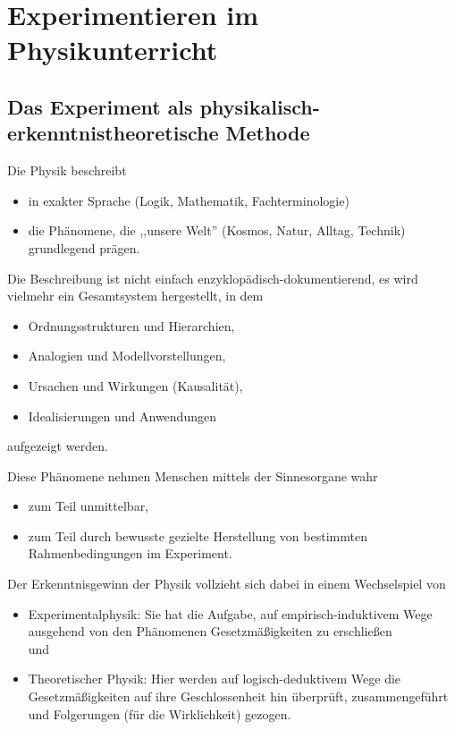 \chapter{Experimentieren im Physikunterricht}\label{Experiment}

\section{Das Experiment als physikalisch-
                         erkenntnistheoretische Methode}

Die Physik beschreibt
\begin{itemize}
	\item
	in exakter Sprache (Logik, Mathematik, Fachterminologie)
	\item
	die Ph\"{a}nomene, die ,,unsere Welt'' (Kosmos, Natur,
	Alltag, Technik) grundlegend pr\"{a}gen.
\end{itemize}

Die Beschreibung ist nicht einfach enzyklop\"{a}disch-dokumentierend,
es wird vielmehr ein Gesamtsystem hergestellt, in dem
\begin{itemize}
	\item
	Ordnungsstrukturen und Hierarchien,
	\item
	Analogien und Modellvorstellungen,
	\item
	Ursachen und Wirkungen (Kausalit\"{a}t),
	\item
	Idealisierungen und Anwendungen
\end{itemize}
aufgezeigt werden.

Diese Ph\"{a}nomene nehmen Menschen mittels der Sinnesorgane wahr
\begin{itemize}
	\item
	zum Teil unmittelbar,
	\item
	zum Teil durch bewusste gezielte Herstellung von bestimmten
	Rahmenbedingungen im Experiment.
\end{itemize}

Der Erkenntnisgewinn der Physik vollzieht sich dabei in einem
Wechselspiel von
\begin{itemize}
	\item
	Experimentalphysik: Sie hat die Aufgabe, auf
	empirisch-induktivem Wege ausgehend von den Ph\"{a}nomenen
	Gesetzm\"{a}{\ss}igkeiten zu erschlie{\ss}en \\ und
	\item
	Theoretischer Physik:
	Hier werden auf logisch-deduktivem Wege die Gesetzm\"{a}{\ss}igkeiten
	auf ihre Geschlossenheit hin \"{u}berpr\"{u}ft, zusammengef\"{u}hrt und
	Folgerungen (f\"{u}r die Wirklichkeit) gezogen.
\end{itemize}

